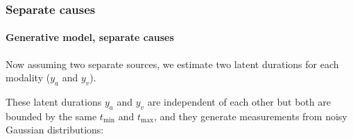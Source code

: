\documentclass[9pt,lineno,doublespacing]{elife}
\begin{document}






\subsubsection{Separate causes}

\paragraph{Generative model, separate causes}

Now assuming two separate sources, we estimate two latent durations for each modality ($y_a$ and $y_v$).

These latent durations $y_a$ and $y_v$ are independent of each other but both are bounded by the same $t_{\min}$ and $t_{\max}$, and they generate measurements from noisy Gaussian distributions:
\end{document}
